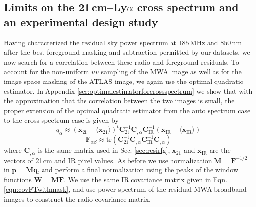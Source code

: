 \documentclass[numberedappendix]{emulateapj}
\newcommand{\IR}{\text{IR}}
\newcommand{\Fb}{\mathbf{F}}
\newcommand{\Mb}{\mathbf{M}}
\newcommand{\Cb}{\mathbf{C}}
\newcommand{\xb}{\mathbf{x}}
\newcommand{\pb}{\mathbf{p}}
\newcommand{\qb}{\mathbf{q}}
\newcommand{\Wb}{\mathbf{W}}
\begin{document}
\subsection{Limits on the 21\,cm--Ly$\alpha$ cross spectrum and an experimental design study}
\label{sec:limitsandexptdesignstudy}

Having characterized the residual sky power spectrum at 185\,MHz and 850\,nm after the best foreground masking and subtraction permitted by our datasets, we now search for a correlation between these radio and foreground residuals. To account for the non-uniform $uv$ sampling of the MWA image as well as for the image space masking of the ATLAS image, we again use the optimal quadratic estimator. In Appendix \ref{sec:optimalestimatorforcrossspectrum} we show that with the approximation that the correlation between the two images is small, the proper extension of the optimal quadratic estimator from the auto spectrum case to the cross spectrum case is given by
\begin{equation}
q_\alpha \approx (\xb_{21}-\langle\xb_{21}\rangle)^t \Cb_{21}^{-1} \Cb_{,\alpha}\Cb_\IR^{-1}(\xb_\IR-\langle\xb_\IR\rangle)
\end{equation}
\begin{equation}
\Fb_{\alpha\beta}\approx\text{tr}\left(\Cb_{21}^{-1} \Cb_{,\alpha} \Cb_\IR^{-1}  \Cb_{,\alpha}  \right)	
\end{equation}
where $\Cb_{,\alpha}$ is the same matrix used in Sec. \ref{sec:resirfg}, $\mathbf{x}_{21}$ and $\mathbf{x}_{\IR}$ are the vectors of 21\,cm and IR pixel values. As before we use normalization $\Mb=\Fb^{-1/2}$ in $\pb=\Mb\qb$, and perform a final normalization using the peaks of the window functions $\Wb=\Mb\Fb$. We use the same IR covariance matrix given in Eqn. \ref{eqn:covFTwithmask}, and use power spectrum of the residual MWA broadband images to construct the radio covariance matrix.
\end{document}

